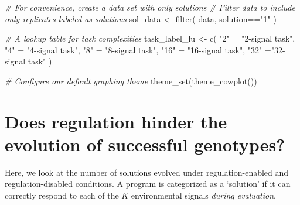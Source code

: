 \documentclass[
]{book}
\newenvironment{Shaded}{\begin{snugshade}}{\end{snugshade}}
\newcommand{\CommentTok}[1]{\textcolor[rgb]{0.56,0.35,0.01}{\textit{#1}}}
\newcommand{\FunctionTok}[1]{\textcolor[rgb]{0.00,0.00,0.00}{#1}}
\newcommand{\NormalTok}[1]{#1}
\newcommand{\OtherTok}[1]{\textcolor[rgb]{0.56,0.35,0.01}{#1}}
\newcommand{\SpecialCharTok}[1]{\textcolor[rgb]{0.00,0.00,0.00}{#1}}
\newcommand{\StringTok}[1]{\textcolor[rgb]{0.31,0.60,0.02}{#1}}
\begin{document}
\begin{Shaded}
\begin{Highlighting}[]
\CommentTok{\# For convenience, create a data set with only solutions}
\CommentTok{\# Filter data to include only replicates labeled as solutions}
\NormalTok{sol\_data }\OtherTok{\textless{}{-}} \FunctionTok{filter}\NormalTok{(}
\NormalTok{  data,}
\NormalTok{  solution}\SpecialCharTok{==}\StringTok{"1"}
\NormalTok{)}

\CommentTok{\# A lookup table for task complexities}
\NormalTok{task\_label\_lu }\OtherTok{\textless{}{-}} \FunctionTok{c}\NormalTok{(}
  \StringTok{"2"} \OtherTok{=} \StringTok{"2{-}signal task"}\NormalTok{,}
  \StringTok{"4"} \OtherTok{=} \StringTok{"4{-}signal task"}\NormalTok{,}
  \StringTok{"8"} \OtherTok{=} \StringTok{"8{-}signal task"}\NormalTok{,}
  \StringTok{"16"} \OtherTok{=} \StringTok{"16{-}signal task"}\NormalTok{,}
  \StringTok{"32"} \OtherTok{=}\StringTok{"32{-}signal task"}
\NormalTok{)}

\CommentTok{\# Configure our default graphing theme}
\FunctionTok{theme\_set}\NormalTok{(}\FunctionTok{theme\_cowplot}\NormalTok{())}
\end{Highlighting}
\end{Shaded}

\hypertarget{does-regulation-hinder-the-evolution-of-successful-genotypes}{%
\section{Does regulation hinder the evolution of successful genotypes?}\label{does-regulation-hinder-the-evolution-of-successful-genotypes}}

Here, we look at the number of solutions evolved under regulation-enabled and regulation-disabled conditions.
A program is categorized as a `solution' if it can correctly respond to each of the \(K\) environmental signals \emph{during evaluation}.
\end{document}
